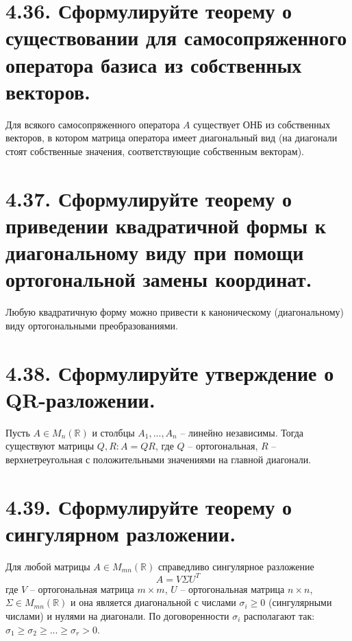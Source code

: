 \documentclass{article}
\begin{document}
\section*{\LARGE 4.36. Сформулируйте теорему о существовании для самосопряженного оператора базиса из собственных векторов. }
Для всякого самосопряженного оператора $A$ существует ОНБ из собственных векторов, в котором матрица оператора имеет диагональный вид (на диагонали стоят собственные значения, соответствующие собственным векторам).

\section*{\LARGE 4.37. Сформулируйте теорему о приведении квадратичной формы к диагональному виду при помощи ортогональной замены координат. }
Любую квадратичную форму можно привести к каноническому (диагональному) виду ортогональными преобразованиями.

\section*{\LARGE 4.38. Сформулируйте утверждение о QR-разложении.}
Пусть $A \in M_n(\mathbb{R})$ и столбцы $A_1, ... , A_n$ -- линейно независимы. Тогда существуют матрицы $Q, R : A = QR$, где $Q$ -- ортогональная, $R$ -- верхнетреугольная с положительными значениями на главной диагонали.

\section*{\LARGE 4.39. Сформулируйте теорему о сингулярном разложении.}
Для любой матрицы $A \in M_{mn}(\mathbb{R})$ справедливо сингулярное разложение 
$$A = V \Sigma U^T$$
где $V$ -- ортогональная матрица $m\times m$, $U$ -- ортогональная матрица $n\times n$, $\Sigma \in M_{mn}(\mathbb{R})$ и она является диагональной с числами $\sigma_i \ge 0$ (сингулярными числами) и нулями на диагонали.
\newline По договоренности $\sigma_i$ располагают так: $\sigma_1 \ge \sigma_2 \ge ... \ge \sigma_r > 0$.

\end{document}
